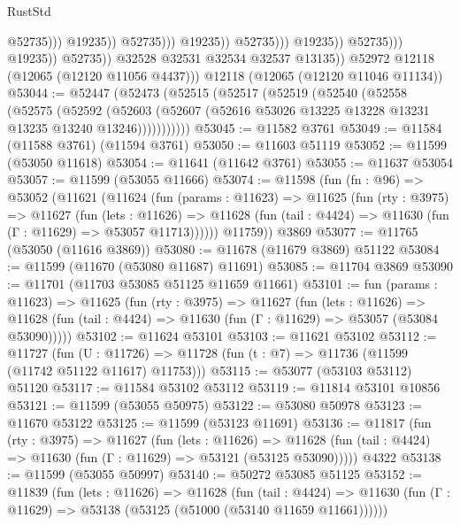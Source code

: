 \begin{lexlean}{RustStd}
\begin{coremodule}
                                                      @52735)))
                                                @19235))
                                            @52735)))
                                      @19235))
                                  @52735)))
                            @19235))
                        @52735)))
                  @19235))
              @52735))
          @32528
          @32531
          @32534
          @32537
          @13135))
      @52972
      @12118
      (@12065 (@12120 @11056 @4437)))
    @12118
    (@12065 (@12120 @11046 @11134))
@53044 := @52447
    (@52473
      (@52515
        (@52517
          (@52519
            (@52540
              (@52558
                (@52575
                  (@52592
                    (@52603
                      (@52607 (@52616 @53026 @13225 @13228 @13231 @13235 @13240 @13246)))))))))))
@53045 := @11582 @3761
@53049 := @11584 (@11588 @3761) (@11594 @3761)
@53050 := @11603 @51119
@53052 := @11599 (@53050 @11618)
@53054 := @11641 (@11642 @3761)
@53055 := @11637 @53054
@53057 := @11599 (@53055 @11666)
@53074 := @11598
    (fun (fn : @96) =>
    @53052
      (@11621
        (@11624
          (fun (params : @11623) =>
          @11625
            (fun (rty : @3975) =>
            @11627
              (fun (lets : @11626) =>
              @11628 (fun (tail : @4424) => @11630 (fun (Γ : @11629) => @53057 @11713))))))
        @11759))
    @3869
@53077 := @11765 (@53050 (@11616 @3869))
@53080 := @11678 (@11679 @3869) @51122
@53084 := @11599 (@11670 (@53080 @11687) @11691)
@53085 := @11704 @3869
@53090 := @11701 (@11703 @53085 @51125 @11659 @11661)
@53101 := fun (params : @11623) =>
  @11625
    (fun (rty : @3975) =>
    @11627
      (fun (lets : @11626) =>
      @11628 (fun (tail : @4424) => @11630 (fun (Γ : @11629) => @53057 (@53084 @53090)))))
@53102 := @11624 @53101
@53103 := @11621 @53102
@53112 := @11727
    (fun (U : @11726) => @11728 (fun (t : @7) => @11736 (@11599 (@11742 @51122 @11617) @11753)))
@53115 := @53077 (@53103 @53112) @51120
@53117 := @11584 @53102 @53112
@53119 := @11814 @53101 @10856
@53121 := @11599 (@53055 @50975)
@53122 := @53080 @50978
@53123 := @11670 @53122
@53125 := @11599 (@53123 @11691)
@53136 := @11817
    (fun (rty : @3975) =>
    @11627
      (fun (lets : @11626) =>
      @11628 (fun (tail : @4424) => @11630 (fun (Γ : @11629) => @53121 (@53125 @53090)))))
    @4322
@53138 := @11599 (@53055 @50997)
@53140 := @50272 @53085 @51125
@53152 := @11839
    (fun (lets : @11626) =>
    @11628
      (fun (tail : @4424) =>
      @11630 (fun (Γ : @11629) => @53138 (@53125 (@51000 (@53140 @11659 @11661))))))

\end{coremodule}
\end{lexlean}
